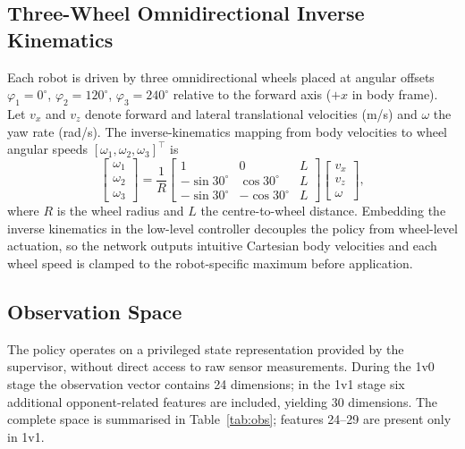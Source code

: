 \documentclass[conference]{IEEEtran}
\begin{document}
\subsection{Three-Wheel Omnidirectional Inverse Kinematics}
Each robot is driven by three omnidirectional wheels placed at angular offsets
$\varphi_1 = 0^\circ$, $\varphi_2 = 120^\circ$, $\varphi_3 = 240^\circ$ relative to
the forward axis ($+x$ in body frame). Let $v_x$ and $v_z$ denote forward and
lateral translational velocities (m/s) and $\omega$ the yaw rate (rad/s). The
inverse-kinematics mapping from body velocities to wheel angular speeds
$[\omega_1,\omega_2,\omega_3]^\top$ is
\begin{equation}
\begin{bmatrix} \omega_1 \\ \omega_2 \\ \omega_3 \end{bmatrix}
= \frac{1}{R}
\begin{bmatrix}
1 & 0 & L \\
-\sin 30^\circ & \cos 30^\circ & L \\
-\sin 30^\circ & -\cos 30^\circ & L
\end{bmatrix}
\begin{bmatrix} v_x \\ v_z \\ \omega \end{bmatrix},
\end{equation}
where $R$ is the wheel radius and $L$ the centre-to-wheel distance. Embedding the
inverse kinematics in the low-level controller decouples the policy from
wheel-level actuation, so the network outputs intuitive Cartesian body velocities
and each wheel speed is clamped to the robot-specific maximum before application.

\subsection{Observation Space}
The policy operates on a privileged state representation provided by the supervisor,
without direct access to raw sensor measurements. During the 1v0 stage the
observation vector contains 24 dimensions; in the 1v1 stage six additional
opponent-related features are included, yielding 30 dimensions. The complete space
is summarised in Table~\ref{tab:obs}; features 24--29 are present only in 1v1.
\end{document}
